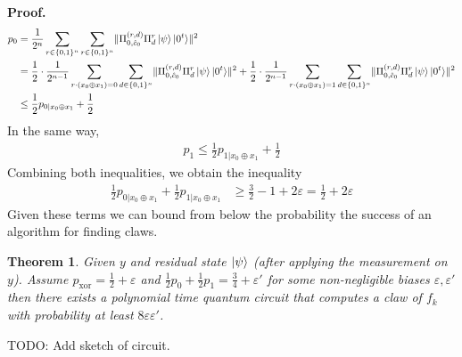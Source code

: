 \documentclass{article}
\newtheorem{thm}{Theorem}
\begin{document}
\textbf{Proof.} \begin{align}
    p_{0}&= \frac{1}{2^{n}}\sum_{r\in\{0,1\}^{n}}\sum_{r\in\{0,1\}^{n}}\lVert \Pi_{0,\hat{c}_{0}}^{(r,d)}\Pi_{d}^{r} \ket{\psi}\ket{0^{t}} \rVert^{2}\\ &= \frac{1}{2}\cdot\frac{1}{2^{n-1}}\sum_{r\cdot (x_{0}\oplus x_{1})=0}\sum_{d \in \{0,1\}^{n}}\lVert \Pi_{0,\hat{c}_{0}}^{(r,d)}\Pi_{d}^{r} \ket{\psi}\ket{0^{t}} \rVert^{2} + \frac{1}{2}\cdot\frac{1}{2^{n-1}}\sum_{r\cdot (x_{0}\oplus x_{1})=1}\sum_{d\in\{0,1\}^{n}}\lVert \Pi_{0,\hat{c}_{0}}^{(r,d)}\Pi_{d}^{r} \ket{\psi}\ket{0^{t}} \rVert^{2}\\
    &\leq \frac{1}{2} p_{0|x_{0}\oplus x_{1}} + \frac{1}{2}
\end{align} In the same way, \begin{align}
    p_{1}\leq \frac{1}{2}p_{1|x_{0}\oplus x_{1}} + \frac{1}{2}
\end{align}
Combining both inequalities, we obtain the inequality \begin{align}
    \frac{1}{2}p_{0|x_{0}\oplus x_{1}}+\frac{1}{2}p_{1|x_{0}\oplus x_{1}}&\geq \frac{3}{2}-1+2\varepsilon = \frac{1}{2} + 2\varepsilon
\end{align}
Given these terms we can bound from below the probability the success of an algorithm for finding claws.
 \begin{thm} \label{maintheorem} Given $y$ and residual state $\ket{\psi}$ (after applying the measurement on $y$).
Assume $p_{\mathrm{xor}}= \frac{1}{2}+\varepsilon$ and $\frac{1}{2}p_{0}+\frac{1}{2}p_{1}= \frac{3}{4}+\varepsilon'$ for some non-negligible biases $\varepsilon, \varepsilon'$ then there exists a polynomial time quantum circuit that computes a claw of $f_{k}$ with probability at least $8\varepsilon\varepsilon'$.
\end{thm}
TODO: Add sketch of circuit.
\end{document}
